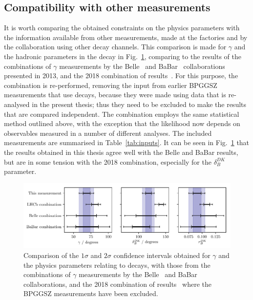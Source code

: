 \subsection{Compatibility with other measurements} %
\label{sub:compatibility_with_other_measurements}

It is worth comparing the obtained constraints on the physics parameters with the information available from other measurements, made at the \B factories and by the \lhcb collaboration using other decay channels. This comparison is made for $\gamma$ and the hadronic parameters in the \BtoDK decay in Fig.~\ref{fig:all_gamma_results}, comparing to the results of the combinations of $\gamma$ measurements by the Belle~\cite{BelleCombo} and BaBar~\cite{BabarCombo} collaborations presented in 2013, and the 2018 combination of \lhcb results~\cite{LHCb-CONF-2018-002}. For this purpose, the \lhcb combination is re-performed,  removing the input from earlier BPGGSZ measurements that use \BtoDK decays, because they were made using data that is re-analysed in the present thesis; thus they need to be excluded to make the results that are compared independent. The combination employs the same statistical method outlined above, with the exception that the likelihood now depends on observables measured in a number of different analyses. The included measurements are summarised in Table~\ref{tab:inputs}. It can be seen in Fig.~\ref{fig:all_gamma_results} that the results obtained in this thesis agree well with the Belle and BaBar results, but are in some tension with the 2018 \lhcb combination, especially for the $\delta_B^{DK}$ parameter.

\begin{figure}[tb]
    \centering
    \includegraphics[width=\columnwidth]{figures/analysis/interpretation/experiment_comparison.pdf}
    \caption{Comparison of the $1\sigma$ and $2\sigma$ confidence intervals obtained for $\gamma$ and the physics parameters relating to \BtoDK decays, with those from the combinations of $\gamma$ measurements by the Belle~\cite{BelleCombo} and BaBar~\cite{BabarCombo} collaborations, and the 2018 combination of \lhcb results~\cite{LHCb-CONF-2018-002} where the BPGGSZ measurements have been excluded.}
    \label{fig:all_gamma_results}
\end{figure}

